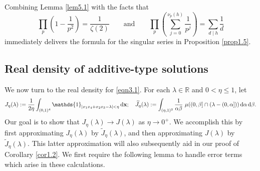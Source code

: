 \documentclass[12pt,reqno]{amsart}
\theoremstyle{definition}
\theoremstyle{remark}
\numberwithin{equation}{section}
\def \R {\mathbb{R}}
\def\d{{\,{\rm d}}}
\newcommand\1{\mathds{1}}
\begin{document}
Combining Lemma \ref{lem5.1} with the facts that 
\begin{equation}\label{eqn5.2}
    \prod_p\left( 1-\frac{1}{p^2}\right) = \frac{1}{\zeta(2)} \qquad \text{and} \qquad \prod_p \left(\sum_{j=0}^{\nu_p(h)}\frac{1}{p^j}\right) = \sum_{d\mid h}\frac{1}{d}
\end{equation}
immediately delivers the formula for the singular series in Proposition \ref{prop1.5}.

\subsection{Real density of additive-type solutions}

We now turn to the real density for \eqref{eqn3.1}. For each $\lambda\in\R$ and $0<\eta\leqslant 1$, let
\begin{equation*}
    J_{\eta}(\lambda) := \frac{1}{2\eta}\int_{(0,1)^4}\1_{|x_1x_4 + x_2x_3 - \lambda| < \eta} \d \mathbf{x}; \quad 
    \widetilde{J}_\eta(\lambda):=\int_{(\eta,1)^2} \frac{1}{\alpha \beta} \ \mu( (0, \beta] \cap (\lambda - (0, \alpha]  ) )\d \alpha \d \beta.
\end{equation*}
Our goal is to show that $J_\eta(\lambda)\to J(\lambda)$ as $\eta\to 0^+$. We accomplish this by first approximating $J_\eta(\lambda)$ by $\widetilde{J}_\eta(\lambda)$, and then approximating $J(\lambda)$ by $\widetilde{J}_\eta(\lambda)$. This latter approximation will also subsequently aid in our proof of Corollary \ref{cor1.2}. We first require the following lemma to handle error terms which arise in these calculations.
\end{document}
